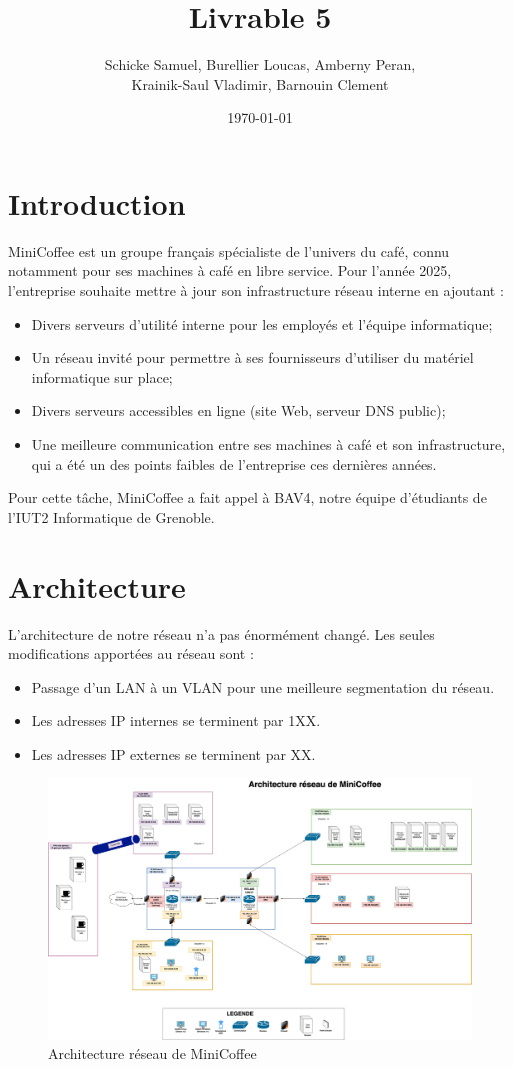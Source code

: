 \documentclass{article}
\title{Livrable 5}
\author{
Schicke Samuel, Burellier Loucas, Amberny Peran, \\
Krainik-Saul Vladimir, Barnouin Clement
}
\date{\today}
\begin{document}
\maketitle


\section{Introduction}
MiniCoffee est un groupe français spécialiste de l’univers du café, connu notamment pour ses machines à café en libre service. Pour l’année 2025, l’entreprise souhaite mettre à jour son infrastructure réseau interne en ajoutant : 
\begin{itemize}
    \item Divers serveurs d’utilité interne pour les employés et l'équipe informatique;
    \item Un réseau invité pour permettre à ses fournisseurs d’utiliser du matériel informatique sur place;
    \item Divers serveurs accessibles en ligne (site Web, serveur DNS public);
    \item Une meilleure communication entre ses machines à café et son infrastructure, qui a été un des points faibles de l’entreprise ces dernières années.
\end{itemize}
Pour cette tâche, MiniCoffee a fait appel à BAV4, notre équipe d’étudiants de l’IUT2 Informatique de Grenoble.

\section{Architecture}
L'architecture de notre réseau n'a pas énormément changé. 
Les seules modifications apportées au réseau sont : 
\begin{itemize}
    \item Passage d'un LAN à un VLAN pour une meilleure segmentation du réseau.
    \item Les adresses IP internes se terminent par 1XX.
    \item Les adresses IP externes se terminent par XX.
\end{itemize}

\begin{figure}
    \centering
    \includegraphics[width=1.2\textwidth, trim=0 0 0 2.3cm, clip]{../assets/Architecture.drawio.png}
    \caption{Architecture réseau de MiniCoffee}
\end{figure}
\end{document}
